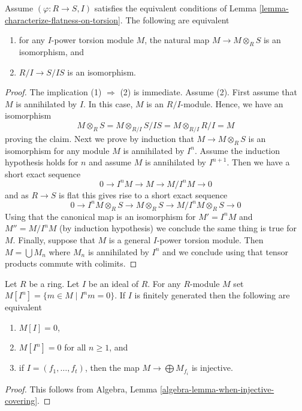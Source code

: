 \begin{lemma}
\label{lemma-neighbourhood-isomorphism}
Assume $(\varphi : R \to S, I)$ satisfies the equivalent conditions of
Lemma \ref{lemma-characterize-flatness-on-torsion}.
The following are equivalent
\begin{enumerate}
\item for any $I$-power torsion module $M$, the natural map
$M \to M \otimes_R S$ is an isomorphism, and
\item $R/I \to S/IS$ is an isomorphism.
\end{enumerate}
\end{lemma}

\begin{proof}
The implication (1) $\Rightarrow$ (2) is immediate.
Assume (2). First assume that $M$ is annihilated by $I$.
In this case, $M$ is an $R/I$-module. Hence, we have an isomorphism
$$
M \otimes_R S = M \otimes_{R/I} S/IS = M \otimes_{R/I} R/I = M
$$
proving the claim. Next we prove by induction that $M \to M \otimes_R S$
is an isomorphism for any module $M$ is annihilated by $I^n$. Assume
the induction hypothesis holds for $n$ and assume $M$ is annihilated by
$I^{n + 1}$. Then we have a short exact sequence
$$
0 \to I^nM \to M \to M/I^nM \to 0
$$
and as $R \to S$ is flat this gives rise to a short exact sequence
$$
0 \to I^nM \otimes_R S \to M \otimes_R S \to M/I^nM \otimes_R S \to 0
$$
Using that the canonical map is an isomorphism for $M' = I^nM$ and
$M'' = M/I^nM$ (by induction hypothesis) we conclude the same thing is
true for $M$. Finally, suppose that $M$ is a general $I$-power torsion
module. Then $M = \bigcup M_n$ where $M_n$ is annihilated by $I^n$
and we conclude using that tensor products commute with colimits.
\end{proof}

\begin{lemma}
\label{lemma-torsion-free}
Let $R$ be a ring. Let $I$ be an ideal of $R$.
For any $R$-module $M$ set $M[I^n] = \{m \in M \mid I^nm = 0\}$.
If $I$ is finitely generated then the following are equivalent
\begin{enumerate}
\item $M[I] = 0$,
\item $M[I^n] = 0$ for all $n \geq 1$, and
\item if $I = (f_1, \ldots, f_t)$, then the map
$M \to \bigoplus M_{f_i}$ is injective.
\end{enumerate}
\end{lemma}

\begin{proof}
This follows from
Algebra, Lemma \ref{algebra-lemma-when-injective-covering}.
\end{proof}

